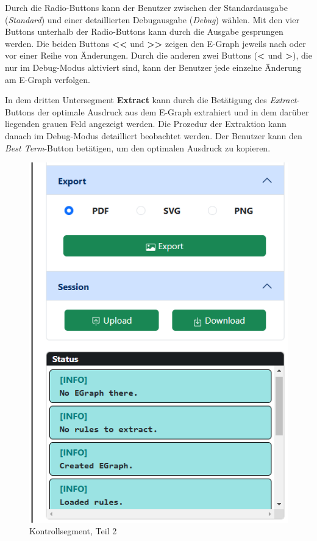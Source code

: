 Durch die Radio-Buttons kann der Benutzer zwischen der Standardausgabe (\textit{Standard}) und einer detaillierten Debugausgabe (\textit{Debug}) wählen.
Mit den vier Buttons unterhalb der Radio-Buttons kann durch die Ausgabe gesprungen werden. Die beiden Buttons \textbf{<<} und \textbf{>>} zeigen den E-Graph jeweils nach oder vor einer 
Reihe von Änderungen. Durch die anderen zwei Buttons (\textbf{<} und \textbf{>}), die nur im Debug-Modus aktiviert sind, kann der Benutzer jede einzelne Änderung am E-Graph verfolgen. 

In dem dritten Untersegment \textbf{Extract} kann durch die Betätigung des \textit{Extract}-Buttons der optimale Ausdruck aus dem E-Graph extrahiert und in dem darüber liegenden grauen Feld angezeigt werden.
Die Prozedur der Extraktion kann danach im Debug-Modus detailliert beobachtet werden. 
Der Benutzer kann den \textit{Best Term}-Button betätigen, um den optimalen Ausdruck zu kopieren.
\newpage

\begin{figure}
    \vspace{-5mm}
    \begin{center}
      \includegraphics[scale=0.6]{../fig/control2.png}
    \end{center}
    \caption{Kontrollsegment, Teil 2}
    \label{fig:segment32}
\end{figure}

